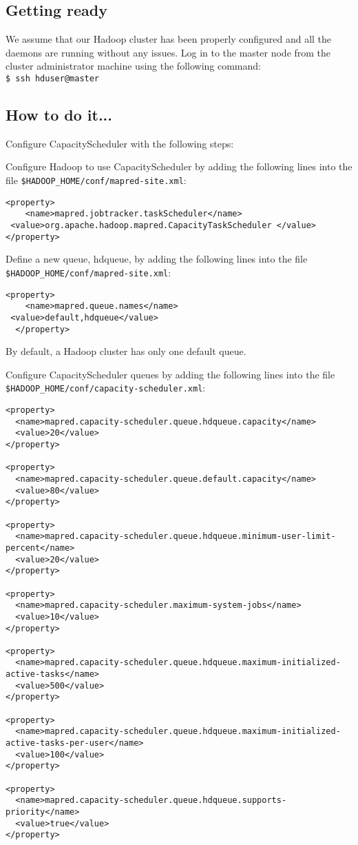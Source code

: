 \subsection*{Getting ready}
We assume that our Hadoop cluster has been properly configured and all the daemons are running without any issues.
Log in to the master node from the cluster administrator machine using the following command:\\
\verb|$ ssh hduser@master|

\subsection*{How to do it...}
Configure CapacityScheduler with the following steps: 

Configure Hadoop to use CapacityScheduler by adding the following lines into the file \verb|$HADOOP_HOME/conf/mapred-site.xml|:
\begin{verbatim}
<property>
    <name>mapred.jobtracker.taskScheduler</name>
 <value>org.apache.hadoop.mapred.CapacityTaskScheduler </value>
</property>
\end{verbatim}

Define a new queue, hdqueue, by adding the following lines into the file \verb|$HADOOP_HOME/conf/mapred-site.xml|:
\begin{verbatim}
<property>
    <name>mapred.queue.names</name>
 <value>default,hdqueue</value>
  </property>
\end{verbatim}

By default, a Hadoop cluster has only one default queue.

Configure CapacityScheduler queues by adding the following lines into the file \verb|$HADOOP_HOME/conf/capacity-scheduler.xml|:
\begin{verbatim}
<property>
  <name>mapred.capacity-scheduler.queue.hdqueue.capacity</name>
  <value>20</value>
</property>

<property>
  <name>mapred.capacity-scheduler.queue.default.capacity</name>
  <value>80</value>
</property>

<property>
  <name>mapred.capacity-scheduler.queue.hdqueue.minimum-user-limit-percent</name>
  <value>20</value>
</property>

<property>
  <name>mapred.capacity-scheduler.maximum-system-jobs</name>
  <value>10</value>
</property>

<property>
  <name>mapred.capacity-scheduler.queue.hdqueue.maximum-initialized-active-tasks</name>
  <value>500</value>
</property>

<property>
  <name>mapred.capacity-scheduler.queue.hdqueue.maximum-initialized-active-tasks-per-user</name>
  <value>100</value>
</property>

<property>
  <name>mapred.capacity-scheduler.queue.hdqueue.supports-priority</name>
  <value>true</value>
</property>
\end{verbatim}

